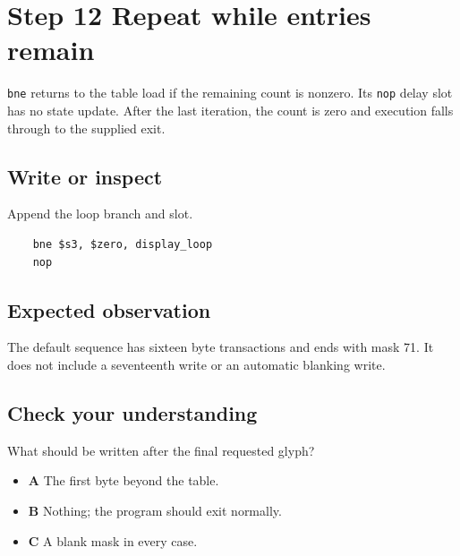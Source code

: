 \section{Step 12 Repeat while entries
  remain}\label{005-seven-segment-counter-s12-step-12-repeat-while-entries-remain}

\texttt{bne} returns to the table load if the remaining count is
nonzero. Its \texttt{nop} delay slot has no state update. After the last
iteration, the count is zero and execution falls through to the supplied
exit.

\subsection{Write or
  inspect}\label{005-seven-segment-counter-s12-write-or-inspect}

Append the loop branch and slot.

\begin{verbatim}
    bne $s3, $zero, display_loop
    nop
\end{verbatim}

\subsection{Expected
  observation}\label{005-seven-segment-counter-s12-expected-observation}

The default sequence has sixteen byte transactions and ends with mask
71. It does not include a seventeenth write or an automatic blanking
write.

\subsection{Check your
  understanding}\label{005-seven-segment-counter-s12-check-your-understanding}

What should be written after the final requested glyph?

\begin{itemize}
  \tightlist
  \item
        \textbf{A} The first byte beyond the table.
  \item
        \textbf{B} Nothing; the program should exit normally.
  \item
        \textbf{C} A blank mask in every case.
\end{itemize}
